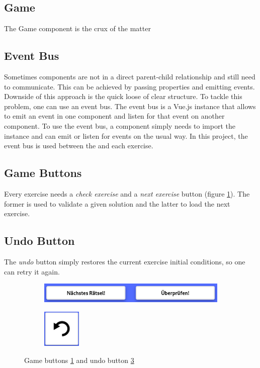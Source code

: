 \subsection*{Game}
The Game component is the crux of the matter

\subsection*{Event Bus}
Sometimes components are not in a direct parent-child relationship and still need to communicate. This can be achieved by passing properties and emitting events. Downside of this approach is the quick loose of clear structure. To tackle this problem, one can use an event bus. 
The event bus is a Vue.js instance that allows to emit an event in one component and listen for that event on another component. To use the event bus, a component simply needs to import the instance and can emit or listen for events on the usual way. In this project, the event bus is used between the  and each exercise.

\subsection*{Game Buttons}
\label{subsection:gameButtons}
Every exercise needs a \textit{check exercise} and a \textit{next exercise} button (figure \ref{fig:gameButtons}). The former is used to validate a given solution and the latter to load the next exercise.

\subsection*{Undo Button}
The \textit{undo} button simply restores the current exercise initial conditions, so one can retry it again.

\begin{figure}[h]
    \centering
    \begin{subfigure}[b]{0.4\textwidth}
        \centering
        \includegraphics[width=\textwidth]{figures/game_buttons.png}
        \subcaption{}
        \label{fig:gameButtons} 
    \end{subfigure}
    \begin{subfigure}[b]{0.4\textwidth}
        \centering
        \includegraphics[width=0.2\textwidth]{figures/undo.png}
        \subcaption{}
        \label{fig:undo} 
    \end{subfigure}
    \caption{Game buttons \ref{fig:gameButtons} and undo button \ref{fig:undo}}
\end{figure}

